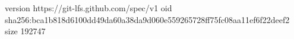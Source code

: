 version https://git-lfs.github.com/spec/v1
oid sha256:bca1b818d6100dd49da60a38da9d060e559265728ff75fc08aa11ef6f22deef2
size 192747
